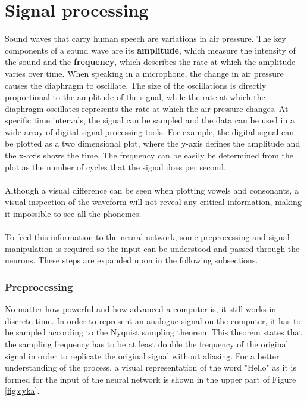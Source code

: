 \section{Signal processing}
Sound waves that carry human speech are variations in air pressure.
The key components of a sound wave are its \textbf{amplitude},
which measure the intensity of the sound and the \textbf{frequency}, which describes the rate at which the amplitude varies over time.
When speaking in a microphone,
the change in air pressure causes the diaphragm to oscillate.
The size of the oscillations is directly proportional to the amplitude of the signal,
while the rate at which the diaphragm oscillates represents the rate at which the air pressure changes.
At specific time intervals,
the signal can be sampled and the data can be used in a wide array of digital signal processing tools.
For example, the digital signal can be plotted as a two dimensional plot,
where the y-axis defines the amplitude and the x-axis shows the time.
The frequency can be easily be determined from the plot as the number of cycles that the signal does per second.\\\\
Although a visual difference can be seen when plotting vowels and consonants,
a visual inspection of the waveform will not reveal any critical information, making it impossible to see all the phonemes.\\\\
To feed this information to the neural network, some preprocessing and signal manipulation is required so the input can be understood and passed through the neurons.
These steps are expanded upon in the following subsections.

\subsubsection{ Preprocessing}
No matter how powerful and how advanced a computer is,
it still works in discrete time.
In order to represent an analogue signal on the computer, it has to be sampled according to the Nyquist sampling theorem.
This theorem states that the sampling frequency has to be at least double the frequency of the original signal in order to replicate the original signal without aliasing.
For a better understanding of the process, a visual representation of the word "Hello" as it is formed for the input of the neural network is shown in the upper part of Figure \ref{fig:cyka}.


